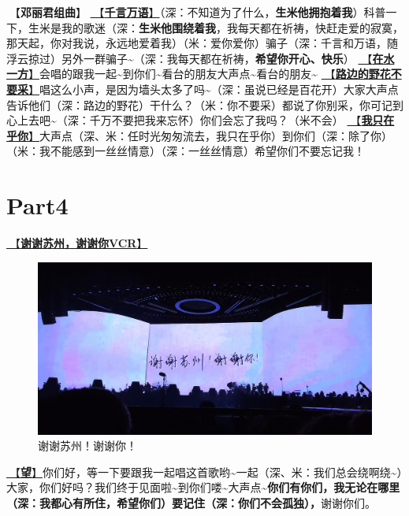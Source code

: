 \documentclass[]{ctexbook}
\begin{document}
🎵【\textbf{邓丽君组曲}】
\hyperref[thousands-of-words]{🎵【\textbf{千言万语}】}（深：不知道为了什么，\textbf{生米他拥抱着我}）科普一下，生米是我的歌迷（深：\textbf{生米他围绕着我}，我每天都在祈祷，快赶走爱的寂寞，那天起，你对我说，永远地爱着我）（米：爱你爱你）骗子（深：千言和万语，随浮云掠过）另外一群骗子\textasciitilde（深：我每天都在祈祷，\textbf{希望你开心、快乐}）
\hyperref[on-the-water-side]{🎵【\textbf{在水一方}】}会唱的跟我一起\textasciitilde 到你们\textasciitilde 看台的朋友大声点\textasciitilde 看台的朋友\textasciitilde{}
\hyperref[only-with-me]{🎵【\textbf{路边的野花不要采}】}唱这么小声，是因为墙头太多了吗\textasciitilde（深：虽说已经是百花开）大家大声点告诉他们（深：路边的野花）干什么？（米：你不要采）都说了你别采，你可记到心上去吧\textasciitilde（深：千万不要把我来忘怀）你们会忘了我吗？（米不会）
\hyperref[only-you]{🎵【\textbf{我只在乎你}】}大声点（深、米：任时光匆匆流去，我只在乎你）到你们（深：除了你）（米：我不能感到一丝丝情意）（深：一丝丝情意）希望你们不要忘记我！

\newpage

\section{Part4}\label{suzhou-20241109-part4}

\hyperref[thank-you-vcr]{🎥【\textbf{谢谢苏州，谢谢你VCR}】}

\begin{figure}

{\centering \includegraphics[width=400pt]{img/suzhou20241109/thank-suzhou} 

}

\caption{谢谢苏州！谢谢你！}\label{fig:unnamed-chunk-127}
\end{figure}

\hyperref[hope]{🎵【\textbf{望}】}你们好，等一下要跟我一起唱这首歌哟\textasciitilde 一起（深、米：我们总会绕啊绕\textasciitilde）大家，你们好吗？我们终于见面啦\textasciitilde 到你们喽\textasciitilde 大声点\textasciitilde{}\textbf{你们有你们，我无论在哪里（深：我都心有所住，希望你们）要记住（深：你们不会孤独），}谢谢你们。
\end{document}
